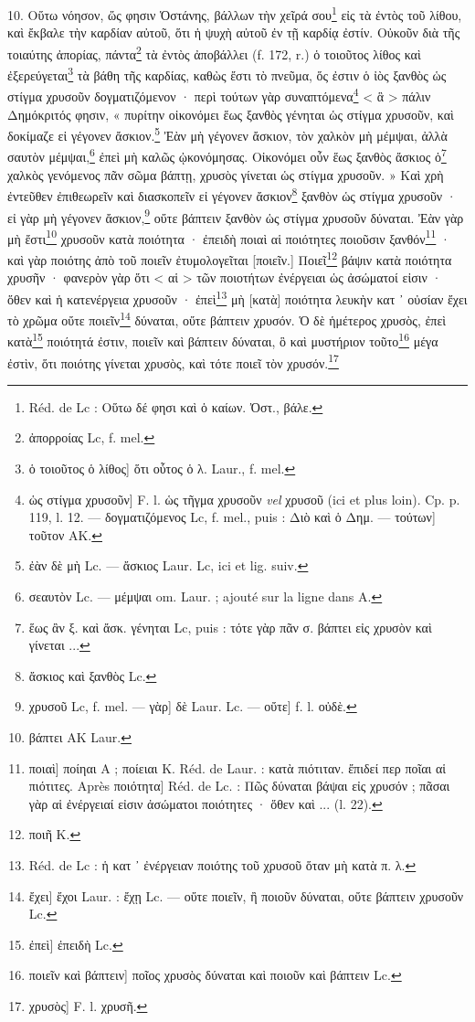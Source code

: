 \documentclass[a4paper, 11pt, oneside, polutonikogreek, french]{article}
\begin{document}
10. Οὕτω νόησον, ὥς φησιν Ὁστάνης, βάλλων τὴν χεῖρά σου\footnote{Réd. de Lc : Οὕτω δέ φησι καὶ ὁ καίων. Ὀστ., βάλε.} εἰς τὰ ἐντὸς τοῦ λίθου, καὶ ἔκβαλε τὴν καρδίαν αὐτοῦ, ὅτι ἡ ψυχὴ αὐτοῦ ἐν τῇ καρδίᾳ ἐστίν. Οὐκοῦν διὰ τῆς τοιαύτης ἀπορίας, πάντα\footnote{ἀπορροίας Lc, f. mel.} τὰ ἐντὸς ἀποβάλλει (f. 172, r.) ὁ τοιοῦτος λίθος καὶ ἐξερεύγεται\footnote{ὁ τοιοῦτος ὁ λίθος] ὅτι οὗτος ὁ λ. Laur., f. mel.} τὰ βάθη τῆς καρδίας, καθὼς ἔστι τὸ πνεῦμα, ὅς ἐστιν ὁ ἰὸς ξανθὸς ὡς στίγμα χρυσοῦν δογματιζόμενον · περὶ τούτων γὰρ συναπτόμενα\footnote{ὡς στίγμα χρυσοῦν] F. l. ὡς τῆγμα χρυσοῦν \emph{vel} χρυσοῦ (ici et plus loin). Cp. p. 119, l. 12. --- δογματιζόμενος Lc, f. mel., puis : Διὸ καὶ ὁ Δημ. --- τούτων] τοῦτον AK.} < ἃ > πάλιν Δημόκριτός φησιν, « πυρίτην οἰκονόμει ἕως ξανθὸς γένηται ὡς στίγμα χρυσοῦν, καὶ δοκίμαζε εἰ γέγονεν ἄσκιον.\footnote{ἐὰν δὲ μὴ Lc. --- ἄσκιος Laur. Lc, ici et lig. suiv.} Ἐὰν μὴ γέγονεν ἄσκιον, τὸν χαλκὸν μὴ μέμψαι, ἀλλὰ σαυτὸν μέμψαι,\footnote{σεαυτὸν Lc. --- μέμψαι om. Laur. ; ajouté sur la ligne dans A.} ἐπεὶ μὴ καλῶς ᾠκονόμησας. Οἰκονόμει οὖν ἕως ξανθὸς ἄσκιος ὁ\footnote{ἕως ἂν ξ. καὶ ἄσκ. γένηται Lc, puis : τότε γὰρ πᾶν σ. βάπτει εἰς χρυσὸν καὶ γίνεται ...} χαλκὸς γενόμενος πᾶν σῶμα βάπτῃ, χρυσὸς γίνεται ὡς στίγμα χρυσοῦν. » Καὶ χρὴ ἐντεῦθεν ἐπιθεωρεῖν καὶ διασκοπεῖν εἰ γέγονεν ἄσκιον\footnote{ἄσκιος καὶ ξανθὸς Lc.} ξανθὸν ὡς στίγμα χρυσοῦν · εἰ γὰρ μὴ γέγονεν ἄσκιον,\footnote{χρυσοῦ Lc, f. mel. --- γὰρ] δὲ Laur. Lc. --- οὔτε] f. l. οὐδὲ.} οὔτε βάπτειν ξανθὸν ὡς στίγμα χρυσοῦν δύναται. Ἐὰν γὰρ μὴ ἔστι\footnote{βάπτει AK Laur.} χρυσοῦν κατὰ ποιότητα · ἐπειδὴ ποιαὶ αἱ ποιότητες ποιοῦσιν ξανθόν\footnote{ποιαὶ] ποίηαι A ; ποίειαι K. Réd. de Laur. : κατὰ πιότιταν. ἔπιδεί περ ποῖαι αἱ πιότιτες. Après ποιότητα] Réd. de Lc. : Πῶς δύναται βάψαι εἰς χρυσόν ; πᾶσαι γὰρ αἱ ἐνέργειαί εἰσιν ἀσώματοι ποιότητες · ὅθεν καὶ ... (l. 22).} · καὶ γὰρ ποιότης ἀπὸ τοῦ ποιεῖν ἐτυμολογεῖται [ποιεῖν.] Ποιεῖ\footnote{ποιῆ K.} βάψιν κατὰ ποιότητα χρυσῆν · φανερὸν γὰρ ὅτι < αἱ > τῶν ποιοτήτων ἐνέργειαι ὡς ἀσώματοί εἰσιν · ὅθεν καὶ ἡ κατενέργεια χρυσοῦν · ἐπεὶ\footnote{Réd. de Lc : ἡ κατ ᾽ ἐνέργειαν ποιότης τοῦ χρυσοῦ ὅταν μὴ κατὰ π. λ.} μὴ [κατὰ] ποιότητα λευκὴν κατ ᾽ οὐσίαν ἔχει τὸ χρῶμα οὔτε ποιεῖν\footnote{ἔχει] ἔχοι Laur. : ἔχῃ Lc. --- οὔτε ποιεῖν, ἢ ποιοῦν δύναται, οὔτε βάπτειν χρυσοῦν Lc.} δύναται, οὔτε βάπτειν χρυσόν. Ὁ δὲ ἡμέτερος χρυσὸς, ἐπεὶ κατὰ\footnote{ἐπεὶ] ἐπειδὴ Lc.} ποιότητά ἐστιν, ποιεῖν καὶ βάπτειν δύναται, ὃ καὶ μυστήριον τοῦτο\footnote{ποιεῖν καὶ βάπτειν] ποῖος χρυσὸς δύναται καὶ ποιοῦν καὶ βάπτειν Lc.} μέγα ἐστὶν, ὅτι ποιότης γίνεται χρυσὸς, καὶ τότε ποιεῖ τὸν χρυσόν.\footnote{χρυσὸς] F. l. χρυσῆ.}
\end{document}
